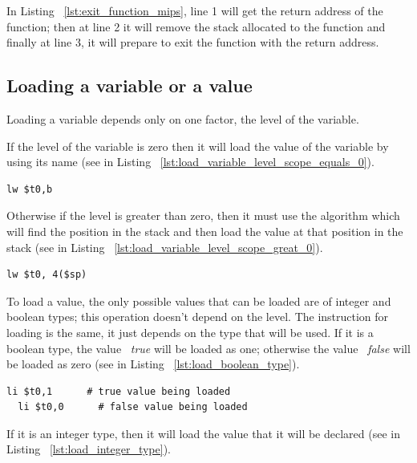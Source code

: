 \documentclass[
  oneside,
  11pt, a4paper,
  footinclude=true,
  headinclude=true,
  cleardoublepage=empty
]{scrbook}
\begin{document}
In Listing ~\ref{lst:exit_function_mips}, line 1 will get the return address of the function; then at line 2 it will remove the stack allocated to the function and finally at line 3, it will prepare to exit the function with the return address.





\subsection{Loading a variable or a value}

Loading a variable depends only on one factor, the level of the variable.

If the level of the variable is zero then it will load the value of the variable by using its name (see in Listing ~\ref{lst:load_variable_level_scope_equals_0}).

\begin{lstlisting}[caption={Loading a variable with level scope equals to zero},label={lst:load_variable_level_scope_equals_0}]
  lw $t0,b
\end{lstlisting}

Otherwise if the level is greater than zero, then it must use the algorithm which will find the position in the stack and then load the value at that position in the stack (see in Listing ~\ref{lst:load_variable_level_scope_great_0}).

\begin{lstlisting}[caption={Loading a variable with level scope greater than zero},label={lst:load_variable_level_scope_great_0}]
  lw $t0, 4($sp)
\end{lstlisting}

To load a value, the only possible values that can be loaded are of integer and boolean types; this operation doesn't depend on the level.
The instruction for loading is the same, it just depends on the type that will be used.
If it is a boolean type, the value ~\textit{true} will be loaded as one; otherwise the value ~\textit{false} will be loaded as zero (see in Listing ~\ref{lst:load_boolean_type}).

\begin{lstlisting}[caption={Loading a boolean value},label={lst:load_boolean_type}]
  li $t0,1		# true value being loaded
  li $t0,0		# false value being loaded
\end{lstlisting}

If it is an integer type, then it will load the value that it will be declared (see in Listing ~\ref{lst:load_integer_type}).
\end{document}

